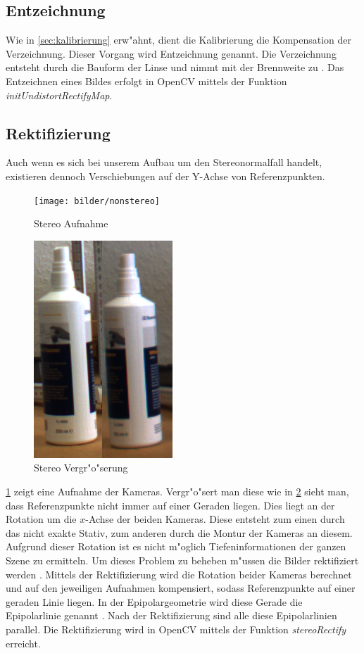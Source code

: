 \subsection{Entzeichnung}
\label{sec:entzeichnung}

Wie in \ref{sec:kalibrierung} erw"ahnt, dient die Kalibrierung die Kompensation der Verzeichnung. Dieser Vorgang wird Entzeichnung genannt. Die Verzeichnung entsteht durch die Bauform der Linse und nimmt mit der Brennweite zu \cite{wie}. Das Entzeichnen eines Bildes erfolgt in OpenCV mittels der Funktion \textit{initUndistortRectifyMap}.

\subsection{Rektifizierung}
\label{sec:rektifizierung}

\noindent Auch wenn es sich bei unserem Aufbau um den Stereonormalfall handelt, existieren dennoch Verschiebungen auf der Y-Achse von Referenzpunkten.

\begin{figure}[H]
	\texttt{[image: bilder/nonstereo]}
	\caption[Stereo Szenenaufnahme]{Stereo Aufnahme}
	\label{fig:steresene}%
\end{figure}

\begin{figure}[H]
	\includegraphics[scale=0.4]{bilder/nonparallal}
	\caption[Stereo Vergr"o"serung]{Stereo Vergr"o"serung}
	\label{fig:vergr}%
\end{figure}

\noindent \ref{fig:steresene} zeigt eine Aufnahme der Kameras. Vergr"o"sert man diese wie in \ref{fig:vergr} sieht man, dass Referenzpunkte nicht immer auf einer Geraden liegen. Dies liegt an der Rotation um die $x$-Achse der beiden Kameras. Diese entsteht zum einen durch das nicht exakte Stativ, zum anderen durch die Montur der Kameras an diesem. Aufgrund dieser Rotation ist es nicht m"oglich Tiefeninformationen der ganzen Szene zu ermitteln. Um dieses Problem zu beheben m"ussen die Bilder rektifiziert werden \cite{zbs}. Mittels der Rektifizierung wird die Rotation beider Kameras berechnet und auf den jeweiligen Aufnahmen kompensiert, sodass Referenzpunkte auf einer geraden Linie liegen. In der Epipolargeometrie wird diese Gerade die Epipolarlinie genannt \cite{ocvs} \cite{wepi}. Nach der Rektifizierung sind alle diese Epipolarlinien parallel. Die Rektifizierung wird in OpenCV mittels der Funktion \textit{stereoRectify} erreicht.

